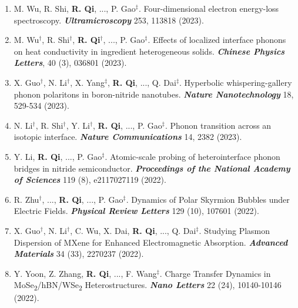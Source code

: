 \documentclass[11pt,sans]{moderncv}
\newcommand{\myemph}[1]{\textbf{\textit{#1}}}
\newcommand{\myname}[1]{\textbf{#1}}
\newcommand{\mylink}[1]{\href{#1}{\color{mycolor}\faLink}}
\begin{document}
\begin{enumerate}[topsep=2pt,itemsep=1ex,partopsep=1ex,parsep=1ex,leftmargin=6.35em,resume]
	\item M. Wu, R. Shi, \myname{R. Qi}, ..., P. Gao$^\ddag$.
	Four-dimensional electron energy-loss spectroscopy.
	\myemph{Ultramicroscopy} 253, 113818 (2023).
	\mylink{https://www.sciencedirect.com/science/article/pii/S0304399123001353}

	\item M. Wu$^\dag$, R. Shi$^\dag$, \myname{R. Qi}$^\dag$, ..., P. Gao$^\ddag$.
	Effects of localized interface phonons on heat conductivity in ingredient heterogeneous solids.
	\myemph{Chinese Physics Letters}, 40 (3), 036801 (2023).
	\mylink{https://iopscience.iop.org/article/10.1088/0256-307X/40/3/036801}

	\item X. Guo$^\dag$, N. Li$^\dag$, X. Yang$^\ddag$, \myname{R. Qi}, ..., Q. Dai$^\ddag$.
	Hyperbolic whispering-gallery phonon polaritons in boron-nitride nanotubes.
	\myemph{Nature Nanotechnology} 18, 529-534 (2023).
	\mylink{https://www.nature.com/articles/s41565-023-01324-3}

	\item N. Li$^\dag$, R. Shi$^\dag$, Y. Li$^\dag$, \myname{R. Qi}, ..., P. Gao$^\ddag$.
	Phonon transition across an isotopic interface.
	\myemph{Nature Communications} 14, 2382 (2023).
	\mylink{https://www.nature.com/articles/s41467-023-38053-z}

	\item Y. Li, \myname{R. Qi}, ..., P. Gao$^\ddag$. 
	Atomic-scale probing of heterointerface phonon bridges in nitride semiconductor. 
	\myemph{Proceedings of the National Academy of Sciences} 119 (8), e2117027119 (2022). 
	\mylink{https://www.pnas.org/content/119/8/e2117027119}

	\item R. Zhu$^\dag$, ..., \myname{R. Qi}, ..., P. Gao$^\ddag$.
	Dynamics of Polar Skyrmion Bubbles under Electric Fields.
	\myemph{Physical Review Letters} 129 (10), 107601 (2022).
	\mylink{https://journals.aps.org/prl/abstract/10.1103/PhysRevLett.129.107601}

	\item X. Guo$^\dag$, N. Li$^\dag$, C. Wu, X. Dai, \myname{R. Qi}, ..., Q. Dai$^\ddag$.
	Studying Plasmon Dispersion of MXene for Enhanced Electromagnetic Absorption.
	\myemph{Advanced Materials} 34 (33), 2270237 (2022).
	\mylink{https://onlinelibrary.wiley.com/doi/full/10.1002/adma.202270237}

	\item Y. Yoon, Z. Zhang, \myname{R. Qi}, ..., F. Wang$^\ddag$. 
	Charge Transfer Dynamics in MoSe\textsubscript{2}/hBN/WSe\textsubscript{2} Heterostructures.
	\myemph{Nano Letters} {22} (24), 10140-10146 (2022).
	\mylink{https://pubs.acs.org/doi/10.1021/acs.nanolett.2c04030}


\end{enumerate}
\end{document}
